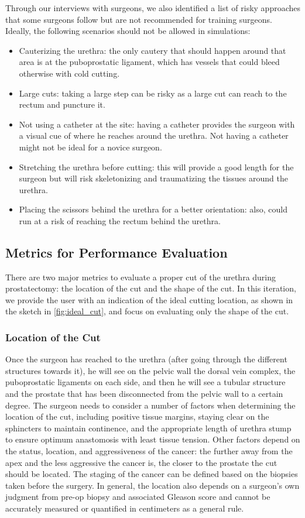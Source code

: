 Through our interviews with surgeons, we also identified a list of risky approaches that some surgeons follow but are not recommended for training surgeons. Ideally, the following scenarios should not be allowed in simulations:
\begin{itemize}[$\star$]
  \item Cauterizing the urethra: the only cautery that should happen around that area is at the puboprostatic ligament, which has vessels that could bleed otherwise with cold cutting.
  \item Large cuts: taking a large step can be risky as a large cut can reach to the rectum and puncture it.
  \item Not using a catheter at the site: having a catheter provides the surgeon with a visual cue of where he reaches around the urethra. Not having a catheter might not be ideal for a novice surgeon.
  \item Stretching the urethra before cutting: this will provide a good length for the surgeon but will risk skeletonizing and traumatizing the tissues around the urethra.
  \item Placing the scissors behind the urethra for a better orientation: also, could run at a risk of reaching the rectum behind the urethra.
\end{itemize}

\subsection{Metrics for Performance Evaluation}
There are two major metrics to evaluate a proper cut of the urethra during prostatectomy: the location of the cut and the shape of the cut. In this iteration, we provide the user with an indication of the ideal cutting location, as shown in the sketch in \autoref{fig:ideal_cut}, and focus on evaluating only the shape of the cut.

\subsubsection{Location of the Cut}
Once the surgeon has reached to the urethra (after going through the different structures towards it), he will see on the pelvic wall the dorsal vein complex, the puboprostatic ligaments on each side, and then he will see a tubular structure and the prostate that has been disconnected from the pelvic wall to a certain degree. The surgeon needs to consider a number of factors when determining the location of the cut, including positive tissue margins, staying clear on the sphincters to maintain continence, and the appropriate length of urethra stump to ensure optimum anastomosis with least tissue tension. Other factors depend on the status, location, and aggressiveness of the cancer: the further away from the apex and the less aggressive the cancer is, the closer to the prostate the cut should be located. The staging of the cancer can be defined based on the biopsies taken before the surgery. In general, the location also depends on a surgeon's own judgment from pre-op biopsy and associated Gleason score and cannot be accurately measured or quantified in centimeters as a general rule.

